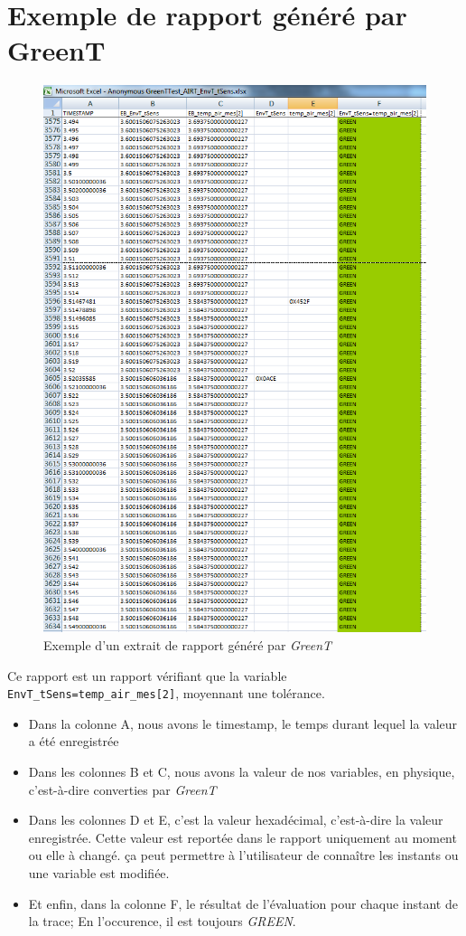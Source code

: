 \chapter{Exemple de rapport généré par GreenT}\label{apendixReport}
\begin{figure}[H]
\centering
\includegraphics[width=13cm]{contents/images/report.png}
\caption{Exemple d'un extrait de rapport généré par \textit{GreenT}}
\end{figure}
Ce rapport est un rapport vérifiant que la variable \texttt{EnvT\_tSens=temp\_air\_mes[2]}, moyennant une tolérance. 

\begin{itemize}
\item Dans la colonne A, nous avons le timestamp, le temps durant lequel la valeur a été enregistrée
\item Dans les colonnes B et C, nous avons la valeur de nos variables, en physique, c'est-à-dire converties par \textit{GreenT}
\item Dans les colonnes D et E, c'est la valeur hexadécimal, c'est-à-dire la valeur enregistrée. Cette valeur est reportée dans le rapport uniquement au moment ou elle à changé. ça peut permettre à l'utilisateur de connaître les instants ou une variable est modifiée.
\item Et enfin, dans la colonne F, le résultat de l'évaluation pour chaque instant de la trace; En l'occurence, il est toujours \textit{GREEN}.
\end{itemize}